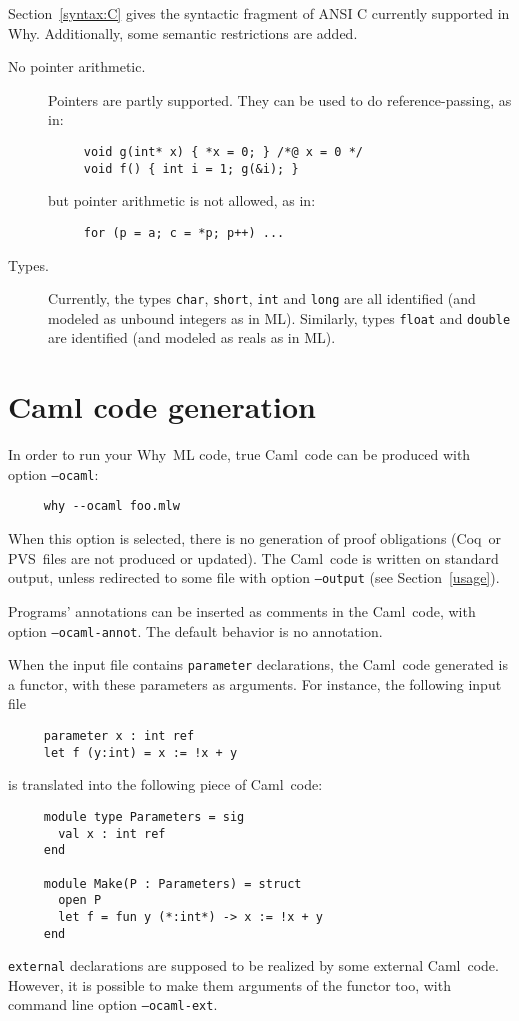 \documentclass[a4paper,12pt]{report}
\makeatletter
\newcommand{\caml}{\textsf{Caml}}
\newcommand{\pvs}{\textsf{PVS}\index{PVS@\textsf{PVS}}}
\newcommand{\coq}{\textsf{Coq}\index{Coq@\textsf{Coq}}}
\newcommand{\why}{\textsf{Why}}
\makeatother
\begin{document}
Section~\ref{syntax:C} gives the syntactic fragment of ANSI C
currently supported in \why. Additionally, some semantic restrictions
are added.
\begin{description}
\item[No pointer arithmetic.] Pointers are partly supported. They can
  be used to do reference-passing, as in:
\begin{verbatim}
     void g(int* x) { *x = 0; } /*@ x = 0 */
     void f() { int i = 1; g(&i); }
\end{verbatim}
  but pointer arithmetic is not allowed, as in:
\begin{verbatim}
     for (p = a; c = *p; p++) ...
\end{verbatim}

\item[Types.] Currently, the types \texttt{char},
  \texttt{short}, \texttt{int} and \texttt{long} are all identified
  (and modeled as unbound integers as in ML). Similarly, types
  \texttt{float} and \texttt{double} are identified (and modeled as
  reals as in ML).

\end{description}


\section{Caml code generation}
\label{ocamlcode}
In order to run your \why\ ML code, true \caml\ code can be
produced with option \texttt{--ocaml}: 
\begin{verbatim}
     why --ocaml foo.mlw
\end{verbatim}
When this option is selected, there is no generation of proof
obligations (\coq\ or \pvs\ files are not produced or updated).
The \caml\ code is written on standard output, unless redirected to
some file with option \texttt{--output} (see Section~\ref{usage}).

Programs' annotations can be inserted as comments in the \caml\ code,
with option \texttt{--ocaml-annot}. The default behavior is no
annotation. 

When the input file contains \texttt{parameter} declarations, the
\caml\ code generated is a functor, with these parameters as
arguments. For instance, the following input file
\begin{verbatim}
     parameter x : int ref
     let f (y:int) = x := !x + y
\end{verbatim}
is translated into the following piece of \caml\ code:
\begin{verbatim}
     module type Parameters = sig
       val x : int ref
     end

     module Make(P : Parameters) = struct
       open P
       let f = fun y (*:int*) -> x := !x + y
     end
\end{verbatim}
\texttt{external} declarations are supposed to be realized by some
external \caml\ code. However, it is possible to make them arguments
of the functor too, with command line option \texttt{--ocaml-ext}.
\end{document}
